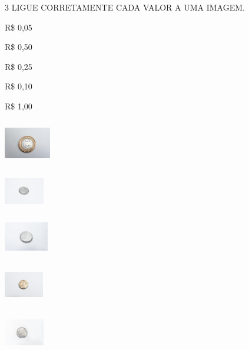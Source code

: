 \pagebreak
\num{3} LIGUE CORRETAMENTE CADA VALOR A UMA IMAGEM.


\begin{multicols}{2}
R\$ 0,05 

R\$ 0,50 

R\$ 0,25 

R\$ 0,10 

R\$ 1,00 

\columnbreak


\includegraphics[width=0.80577in,height=0.79447in]{media/image60.jpg}

\includegraphics[width=0.69145in,height=0.53632in]{media/image61.jpg}

\includegraphics[width=0.75523in,height=0.67928in]{media/image62.jpg}

\includegraphics[width=0.67617in,height=0.63139in]{media/image63.jpg}

\includegraphics[width=0.69044in,height=0.66964in]{media/image64.jpg}
\end{multicols}

